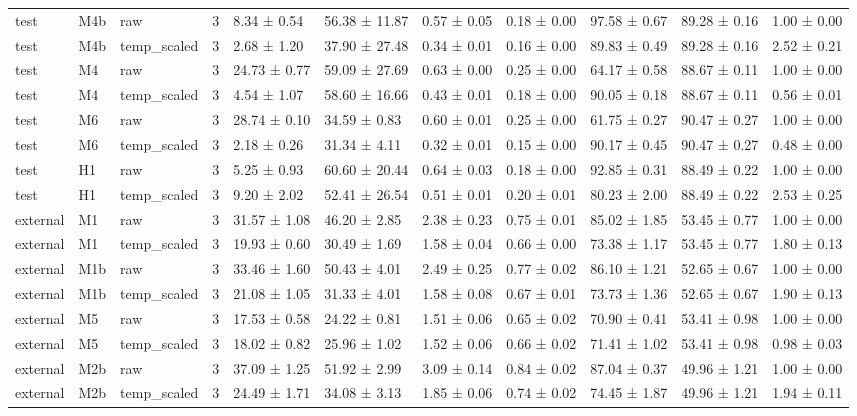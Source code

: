 \begin{tabular}{lllrlllllll}
test & M4b & raw & 3 & 8.34 ± 0.54 & 56.38 ± 11.87 & 0.57 ± 0.05 & 0.18 ± 0.00 & 97.58 ± 0.67 & 89.28 ± 0.16 & 1.00 ± 0.00 \\
test & M4b & temp\_scaled & 3 & 2.68 ± 1.20 & 37.90 ± 27.48 & 0.34 ± 0.01 & 0.16 ± 0.00 & 89.83 ± 0.49 & 89.28 ± 0.16 & 2.52 ± 0.21 \\
test & M4 & raw & 3 & 24.73 ± 0.77 & 59.09 ± 27.69 & 0.63 ± 0.00 & 0.25 ± 0.00 & 64.17 ± 0.58 & 88.67 ± 0.11 & 1.00 ± 0.00 \\
test & M4 & temp\_scaled & 3 & 4.54 ± 1.07 & 58.60 ± 16.66 & 0.43 ± 0.01 & 0.18 ± 0.00 & 90.05 ± 0.18 & 88.67 ± 0.11 & 0.56 ± 0.01 \\
test & M6 & raw & 3 & 28.74 ± 0.10 & 34.59 ± 0.83 & 0.60 ± 0.01 & 0.25 ± 0.00 & 61.75 ± 0.27 & 90.47 ± 0.27 & 1.00 ± 0.00 \\
test & M6 & temp\_scaled & 3 & 2.18 ± 0.26 & 31.34 ± 4.11 & 0.32 ± 0.01 & 0.15 ± 0.00 & 90.17 ± 0.45 & 90.47 ± 0.27 & 0.48 ± 0.00 \\
test & H1 & raw & 3 & 5.25 ± 0.93 & 60.60 ± 20.44 & 0.64 ± 0.03 & 0.18 ± 0.00 & 92.85 ± 0.31 & 88.49 ± 0.22 & 1.00 ± 0.00 \\
test & H1 & temp\_scaled & 3 & 9.20 ± 2.02 & 52.41 ± 26.54 & 0.51 ± 0.01 & 0.20 ± 0.01 & 80.23 ± 2.00 & 88.49 ± 0.22 & 2.53 ± 0.25 \\
external & M1 & raw & 3 & 31.57 ± 1.08 & 46.20 ± 2.85 & 2.38 ± 0.23 & 0.75 ± 0.01 & 85.02 ± 1.85 & 53.45 ± 0.77 & 1.00 ± 0.00 \\
external & M1 & temp\_scaled & 3 & 19.93 ± 0.60 & 30.49 ± 1.69 & 1.58 ± 0.04 & 0.66 ± 0.00 & 73.38 ± 1.17 & 53.45 ± 0.77 & 1.80 ± 0.13 \\
external & M1b & raw & 3 & 33.46 ± 1.60 & 50.43 ± 4.01 & 2.49 ± 0.25 & 0.77 ± 0.02 & 86.10 ± 1.21 & 52.65 ± 0.67 & 1.00 ± 0.00 \\
external & M1b & temp\_scaled & 3 & 21.08 ± 1.05 & 31.33 ± 4.01 & 1.58 ± 0.08 & 0.67 ± 0.01 & 73.73 ± 1.36 & 52.65 ± 0.67 & 1.90 ± 0.13 \\
external & M5 & raw & 3 & 17.53 ± 0.58 & 24.22 ± 0.81 & 1.51 ± 0.06 & 0.65 ± 0.02 & 70.90 ± 0.41 & 53.41 ± 0.98 & 1.00 ± 0.00 \\
external & M5 & temp\_scaled & 3 & 18.02 ± 0.82 & 25.96 ± 1.02 & 1.52 ± 0.06 & 0.66 ± 0.02 & 71.41 ± 1.02 & 53.41 ± 0.98 & 0.98 ± 0.03 \\
external & M2b & raw & 3 & 37.09 ± 1.25 & 51.92 ± 2.99 & 3.09 ± 0.14 & 0.84 ± 0.02 & 87.04 ± 0.37 & 49.96 ± 1.21 & 1.00 ± 0.00 \\
external & M2b & temp\_scaled & 3 & 24.49 ± 1.71 & 34.08 ± 3.13 & 1.85 ± 0.06 & 0.74 ± 0.02 & 74.45 ± 1.87 & 49.96 ± 1.21 & 1.94 ± 0.11 \\

\end{tabular}
